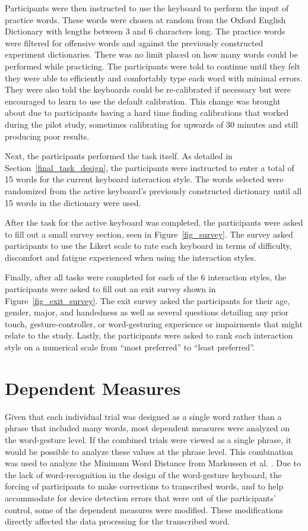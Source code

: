 Participants were then instructed to use the keyboard to perform the input of practice words. These words were chosen at random from the Oxford English Dictionary with lengths between 3 and 6 characters long. The practice words were filtered for offensive words and against the previously constructed experiment dictionaries. There was no limit placed on how many words could be performed while practicing. The participants were told to continue until they felt they were able to efficiently and comfortably type each word with minimal errors. They were also told the keyboards could be re-calibrated if necessary but were encouraged to learn to use the default calibration. This change was brought about due to participants having a hard time finding calibrations that worked during the pilot study, sometimes calibrating for upwards of 30 minutes and still producing poor results.

Next, the participants performed the task itself. As detailed in Section~\ref{final_task_design}, the participants were instructed to enter a total of 15 words for the current keyboard interaction style. The words selected were randomized from the active keyboard's previously constructed dictionary until all 15 words in the dictionary were used.

After the task for the active keyboard was completed, the participants were asked to fill out a small survey section, seen in Figure~\ref{fig_survey}. The survey asked participants to use the Likert scale to rate each keyboard in terms of difficulty, discomfort and fatigue experienced when using the interaction styles.

Finally, after all tasks were completed for each of the 6 interaction styles, the participants were asked to fill out an exit survey shown in Figure~\ref{fig_exit_survey}. The exit survey asked the participants for their age, gender, major, and handedness as well as several questions detailing any prior touch, gesture-controller, or word-gesturing experience or impairments that might relate to the study. Lastly, the participants were asked to rank each interaction style on a numerical scale from ``most preferred'' to ``least preferred''.

\section{Dependent Measures} \label{final_dependent_measures}
Given that each individual trial was designed as a single word rather than a phrase that included many words, most dependent measures were analyzed on the word-gesture level. If the combined trials were viewed as a single phrase, it would be possible to analyze these values at the phrase level. This combination was used to analyze the Minimum Word Distance from Markussen et al. \citeyear{ref_vulture}. Due to the lack of word-recognition in the design of the word-gesture keyboard, the forcing of participants to make corrections to transcribed words, and to help accommodate for device detection errors that were out of the participants' control, some of the dependent measures were modified. These modifications directly affected the data processing for the transcribed word.

